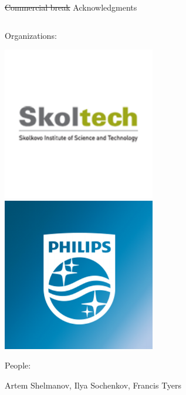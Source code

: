 \documentclass[pdf]{beamer}
\newcommand{\?}{\ensuremath{^\texttt{\bf [CITATION~NEEDED]}}}
\begin{document}
\begin{frame}{\st{Commercial break} Acknowledgments} 

\begin{columns}[T]

\begin{column}{5cm}

Organizations:

\includegraphics[width=0.5\textwidth]{img/skoltech.png}
\includegraphics[width=0.5\textwidth]{img/philips.png}

People:

Artem Shelmanov, Ilya Sochenkov, Francis Tyers

\end{column}


\end{columns}
\end{frame}
\end{document}
